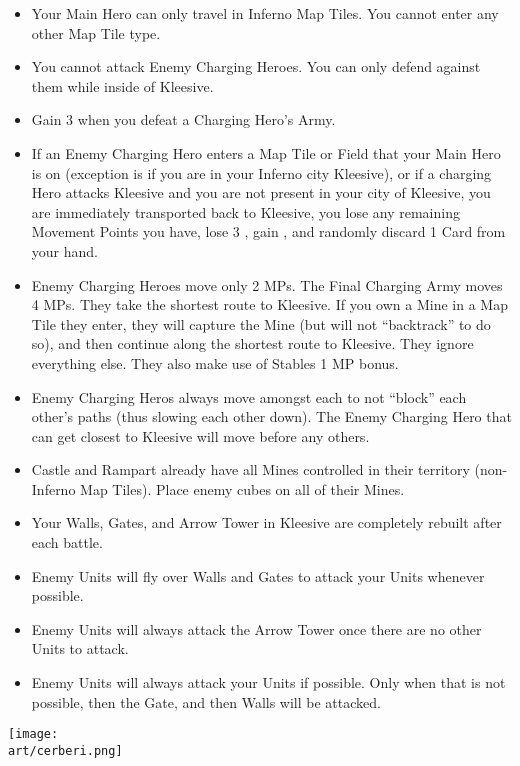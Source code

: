 \begin{multicols*}{2}
\begin{itemize}
  \item Your Main Hero can only travel in Inferno Map Tiles. You cannot enter any other Map Tile type.
  \item You cannot attack Enemy Charging Heroes. You can only defend against them while inside of Kleesive.
  \item Gain 3  when you defeat a Charging Hero's Army.
  \item If an Enemy Charging Hero enters a Map Tile or Field that your Main Hero is on (exception is if you are in
    your Inferno city Kleesive), or if a charging Hero attacks Kleesive and you are not present in your city
    of Kleesive, you are immediately transported back to Kleesive, you lose any remaining Movement Points
    you have, lose 3 , gain , and randomly discard 1 Card from your hand.
  \item Enemy Charging Heroes move only 2 MPs. The Final Charging Army moves 4 MPs. They take the shortest
    route to Kleesive. If you own a Mine in a Map Tile they enter, they will capture the Mine (but will not
    ``backtrack'' to do so), and then continue along the shortest route to Kleesive. They ignore everything
    else. They also make use of Stables 1 MP bonus.
  \item Enemy Charging Heros always move amongst each to not ``block'' each other's paths (thus slowing each
    other down). The Enemy Charging Hero that can get closest to Kleesive will move before any others.
  \item Castle and Rampart already have all Mines controlled in their territory (non-Inferno Map Tiles). Place enemy
    cubes on all of their Mines.
  \item Your Walls, Gates, and Arrow Tower in Kleesive are completely rebuilt after each battle.
  \item Enemy  Units will fly over Walls and Gates to attack your Units whenever possible.
  \item Enemy  Units will always attack the Arrow Tower once there are no other  Units to attack.
  \item Enemy Units will always attack your Units if possible. Only when that is not possible, then the Gate,
    and then Walls will be attacked.
\end{itemize}

\vspace*{\fill}
\texttt{[image: \\art/cerberi.png]}
\vspace*{\fill}

\end{multicols*}

